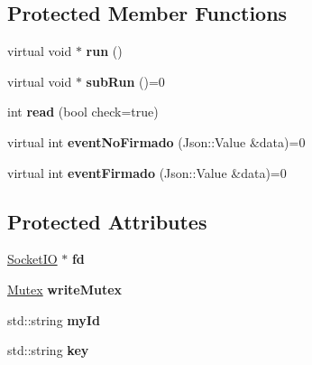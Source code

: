 \subsection*{Protected Member Functions}
\begin{DoxyCompactItemize}
\item 
\hypertarget{classThreadSocket_af1b0cef0db707285a0b85859604c9108}{virtual void $\ast$ {\bfseries run} ()}\label{classThreadSocket_af1b0cef0db707285a0b85859604c9108}

\item 
\hypertarget{classThreadSocket_a7053b41c6b371af8196846f4a8fb4efd}{virtual void $\ast$ {\bfseries sub\-Run} ()=0}\label{classThreadSocket_a7053b41c6b371af8196846f4a8fb4efd}

\item 
\hypertarget{classThreadSocket_a10bcf11e1b8ee011517598ebc6743a0f}{int {\bfseries read} (bool check=true)}\label{classThreadSocket_a10bcf11e1b8ee011517598ebc6743a0f}

\item 
\hypertarget{classThreadSocket_a06335dda20d235a6a39c2996bff43187}{virtual int {\bfseries event\-No\-Firmado} (Json\-::\-Value \&data)=0}\label{classThreadSocket_a06335dda20d235a6a39c2996bff43187}

\item 
\hypertarget{classThreadSocket_a91d3707cd81604c3667813bdcdee19fb}{virtual int {\bfseries event\-Firmado} (Json\-::\-Value \&data)=0}\label{classThreadSocket_a91d3707cd81604c3667813bdcdee19fb}

\end{DoxyCompactItemize}
\subsection*{Protected Attributes}
\begin{DoxyCompactItemize}
\item 
\hypertarget{classThreadSocket_ad04462842b9d43917bf42f19949f0396}{\hyperlink{classSocketIO}{Socket\-I\-O} $\ast$ {\bfseries fd}}\label{classThreadSocket_ad04462842b9d43917bf42f19949f0396}

\item 
\hypertarget{classThreadSocket_a1d262d599d927682b104c667d7da2b4a}{\hyperlink{classMutex}{Mutex} {\bfseries write\-Mutex}}\label{classThreadSocket_a1d262d599d927682b104c667d7da2b4a}

\item 
\hypertarget{classThreadSocket_aad2ecc5af11bbf135d5bcf85bc717fd9}{std\-::string {\bfseries my\-Id}}\label{classThreadSocket_aad2ecc5af11bbf135d5bcf85bc717fd9}

\item 
\hypertarget{classThreadSocket_a48d57199861265eec3eeb69eacd92198}{std\-::string {\bfseries key}}\label{classThreadSocket_a48d57199861265eec3eeb69eacd92198}

\end{DoxyCompactItemize}


